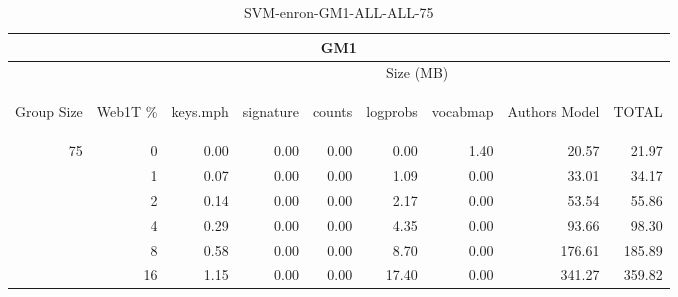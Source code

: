 \begin{center}
\begin{table}[htbp] 
 \begin{center}
\begin{tabular}{ | r | r | r | r | r | r | r | r | r |}
\hline
\multicolumn{9}{|c|}{GM1}\\
\hline
 & & \multicolumn{7}{|c|}{Size (MB)}\\ \cline{3-9}
\begin{sideways}Group Size\end{sideways} & \begin{sideways}Web1T \% \end{sideways} & \begin{sideways}keys.mph\end{sideways} & \begin{sideways}signature\end{sideways} & \begin{sideways}counts\end{sideways} & \begin{sideways}logprobs\end{sideways} & \begin{sideways}vocabmap\end{sideways} & \begin{sideways}Authors Model \end{sideways} & \begin{sideways}TOTAL\end{sideways}\\
\hline
\multirow{5}{*}{75}
 & 0 & 0.00 & 0.00 & 0.00 & 0.00 & 1.40 & 20.57 & 21.97\\ \cline{2-9}
 & 1 & 0.07 & 0.00 & 0.00 & 1.09 & 0.00 & 33.01 & 34.17\\ \cline{2-9}
 & 2 & 0.14 & 0.00 & 0.00 & 2.17 & 0.00 & 53.54 & 55.86\\ \cline{2-9}
 & 4 & 0.29 & 0.00 & 0.00 & 4.35 & 0.00 & 93.66 & 98.30\\ \cline{2-9}
 & 8 & 0.58 & 0.00 & 0.00 & 8.70 & 0.00 & 176.61 & 185.89\\ \cline{2-9}
 & 16 & 1.15 & 0.00 & 0.00 & 17.40 & 0.00 & 341.27 & 359.82\\ \cline{2-9}
\hline
\end{tabular}
\caption{SVM-enron-GM1-ALL-ALL-75}
\label{table:SVM-enron-GM1-ALL-ALL-75}
\end{center}
 \end{table}
\end{center}

